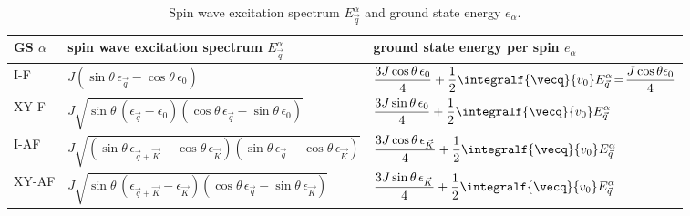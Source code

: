 \begin{table}[t]
    {
        \tabulinesep=1.5mm
        \small
        \begin{tabu} to \textwidth {X[.218]X[1.306]X}
            \toprule
            GS $\alpha$ & spin wave excitation spectrum $E^{\alpha}_{\vec q}$ & ground state energy per spin $e_{\alpha}$ \\
            \midrule
            I-F &   $J (\sin \theta \, \epsilon_{\vec q} - \cos \theta \, \epsilon_{0}) $
                &   $\displaystyle \frac{3 J \cos \theta \, \epsilon_{0}}{4}  +\frac{1}{2} \integralf{\vecq}{v_0} E^{\alpha}_{\vec q}\!=\!\frac{J \cos \theta  \epsilon_{0}}{4}$ \\
            XY-F &  $J \sqrt{ \sin\theta \, (\epsilon_{\vec q}-\epsilon_{0})( \cos\theta \, \epsilon_{\vec q}- \sin \theta \, \epsilon_{0})}$
                 &  $\displaystyle \frac{3 J \sin \theta \, \epsilon_{0} }{4}  +\frac{1}{2} \integralf{\vecq}{v_0} E^{\alpha}_{\vec q}$ \\
            I-AF &  $J \sqrt{( \sin \theta \, \epsilon_{{\vec q}+{\vec K}}-\cos \theta \, \epsilon_{\vec K}) (\sin \theta \, \epsilon_{\vec q}- \cos \theta \, \epsilon_{\vec K })}$
                 &  $\displaystyle  \frac{3  J \cos \theta \, \epsilon_{\vec K} }{4}  +\frac{1}{2} \integralf{\vecq}{v_0} E^{\alpha}_{\vec q}$ \\
            XY-AF & $J \sqrt{\sin \theta \, (  \epsilon_{{\vec q}+{\vec K}}-\epsilon_{\vec K} )( \cos \theta \, \epsilon_{\vec q}-\sin \theta \, \epsilon_{\vec K})}$
                  & $\displaystyle \frac{3 J \sin \theta \, \epsilon_{\vec K} }{4} + \frac{1}{2} \integralf{\vecq}{v_0} E^{\alpha}_{\vec q}$ \\
            \bottomrule
        \end{tabu}
        \caption{  Spin wave excitation spectrum $E_{\vec q}^{\alpha}$ and ground state energy  $e_{\alpha}$.}
    }
\end{table}




